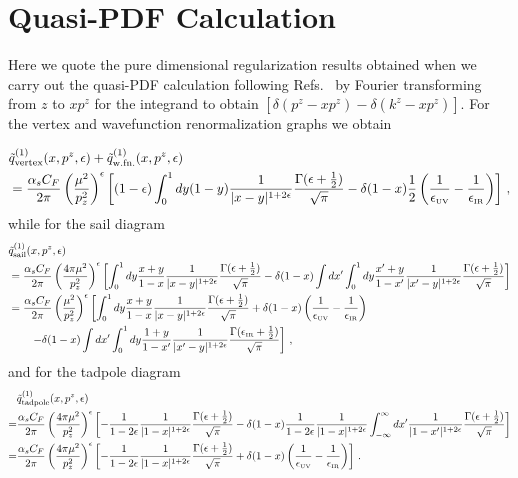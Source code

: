 \section{Quasi-PDF Calculation}
\label{sec:quasi}

Here we quote the pure dimensional regularization results obtained when we carry out the quasi-PDF calculation following Refs.~\cite{Xiong:2013bka,Stewart:2017tvs} by Fourier transforming from $z$ to $x p^z$ for the integrand to obtain $[\delta(p^z-xp^z)-\delta(k^z-xp^z)]$.
For the vertex and wavefunction renormalization graphs we obtain
\begin{widetext}

\begin{align}
	&\tilde{q}^{(1)}_\text{vertex}(x,p^z,\epsilon)
	+ \tilde{q}^{(1)}_\text{w.fn.}(x,p^z,\epsilon)\nonumber\\
	&={\alpha_sC_F\over 2\pi}\left({\mu^2\over p_z^2}\right)^\epsilon \left[ (1-\epsilon)\int_0^1 dy (1-y){1\over |x-y|^{1+2\epsilon}}{\Gamma(\epsilon+{1\over2})\over\sqrt{\pi}}- \delta(1-x){1\over2} \left({1\over\epsilon_{\mbox{\tiny UV}}} - {1\over \epsilon_{\mbox{\tiny IR}}}\right)\right]\,,
\end{align}
while for the sail diagram
\begin{align}
	&\tilde{q}^{(1)}_\text{sail}(x,p^z,\epsilon) \nonumber\\
	&= {\alpha_sC_F\over 2\pi}\left({4\pi\mu^2\over p_z^2}\right)^\epsilon\left[\int_0^1 dy {x+y\over 1-x}{1\over |x-y|^{1+2\epsilon}}{\Gamma(\epsilon+{1\over2})\over\sqrt{\pi}}-\delta(1-x)\int dx'\int_0^1 dy {x'+y\over 1-x'}{1\over |x'-y|^{1+2\epsilon}}{\Gamma(\epsilon+{1\over2})\over\sqrt{\pi}} \right]\nonumber\\
	&= {\alpha_sC_F\over 2\pi}\left({\mu^2\over p_z^2}\right)^\epsilon\left[\int_0^1 dy {x+y\over 1-x}{1\over |x-y|^{1+2\epsilon}}{\Gamma(\epsilon+{1\over2})\over\sqrt{\pi}}+\delta(1-x)\left({1\over\epsilon_{\mbox{\tiny UV}}} - {1\over \epsilon_{\mbox{\tiny IR}}}\right)\right.\nonumber\\
	&\qquad\left. -\delta(1-x)\int dx'\int_0^1 dy {1+y\over 1-x'}{1\over |x'-y|^{1+2\epsilon}}{\Gamma(\epsilon_{\mbox{\tiny IR}}+{1\over2})\over\sqrt{\pi}}\right]\,,
	\end{align}
and for the tadpole diagram
	\begin{align}
	&\tilde{q}^{(1)}_\text{tadpole}(x,p^z,\epsilon)\nonumber\\
	=& {\alpha_sC_F\over 2\pi}\left({4\pi\mu^2\over p_z^2}\right)^\epsilon \left[-{1\over 1-2\epsilon}{1\over |1-x|^{1+2\epsilon}}{\Gamma(\epsilon+{1\over2})\over\sqrt{\pi}} -\delta(1-x) {1\over 1-2\epsilon}{1\over |1-x|^{1+2\epsilon}}\int_{-\infty}^\infty dx' {1\over |1-x'|^{1+2\epsilon}}{\Gamma(\epsilon+{1\over2})\over\sqrt{\pi}}\right]\nonumber\\
	=& {\alpha_sC_F\over 2\pi}\left({4\pi\mu^2\over p_z^2}\right)^\epsilon \left[-{1\over 1-2\epsilon}{1\over |1-x|^{1+2\epsilon}}{\Gamma(\epsilon+{1\over2})\over\sqrt{\pi}} +\delta(1-x)\left({1\over\epsilon_{\mbox{\tiny UV}}} - {1\over \epsilon_{\mbox{\tiny IR}}}\right) \right]\,.
	\end{align}

\end{widetext}
